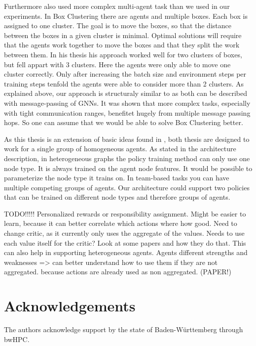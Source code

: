 Furthermore \citet{RobinRuede2021} also used more complex multi-agent task than we used in our experiments. In Box Clustering there are agents and multiple boxes. Each box is assigned to one cluster. The goal is to move the boxes, so that the distance between the boxes in a given cluster is minimal. Optimal solutions will require that the agents work together to move the boxes and that they split the work between them. In his thesis his approach worked well for two clusters of boxes, but fell appart with 3 clusters. Here the agents were only able to move one cluster correctly. Only after increasing the batch size and environment steps per training steps tenfold the agents were able to consider more than 2 clusters. As explained above, our approach is structuraly similar to \citet{RobinRuede2021} as both can be described with message-passing of GNNs. It was shown that more complex tasks, especially with tight communication ranges, benefitet hugely from multiple message passing hops. So one can assume that we would be able to solve Box Clustering better.\par

As this thesis is an extension of basic ideas found in \citet{RobinRuede2021}, both thesis are designed to work for a single group of homogeneous agents. As stated in the architecture description, in heterogeneous graphs the policy training method can only use one node type. It is always trained on the agent node features. It would be possible to parameterize the node type it trains on. In team-based tasks you can have multiple competing groups of agents. Our architecture could support two policies that can be trained on different node types and therefore groups of agents. \par

TODO!!!!!
Personalized rewards or responsibility assignment. Might be easier to learn, because it can better correlate which actions where how good. Need to change critic, as it currently only uses the aggregate of the values. Needs to use each value itself for the critic? Look at some papers and how they do that. This can also help in supporting heterogeneous agents. Agents different strengths and weaknesses => can better understand how to use them if they are not aggregated. because actions are already used as non aggregated. (PAPER!)

\section{Acknowledgements}
The authors acknowledge support by the state of Baden-Württemberg through bwHPC.